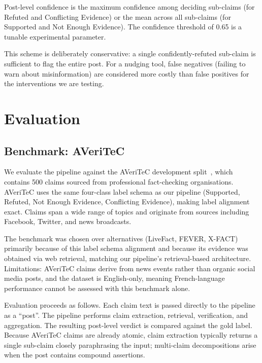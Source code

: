 Post-level confidence is the maximum confidence among deciding sub-claims (for Refuted and Conflicting Evidence) or the mean across all sub-claims (for Supported and Not Enough Evidence). The confidence threshold of 0.65 is a tunable experimental parameter.

This scheme is deliberately conservative: a single confidently-refuted sub-claim is sufficient to flag the entire post. For a nudging tool, false negatives (failing to warn about misinformation) are considered more costly than false positives for the interventions we are testing.

\section{Evaluation}

\subsection{Benchmark: AVeriTeC}

We evaluate the pipeline against the AVeriTeC development split~\cite{schlichtkrull2023averitec}, which contains 500 claims sourced from professional fact-checking organisations. AVeriTeC uses the same four-class label schema as our pipeline (Supported, Refuted, Not Enough Evidence, Conflicting Evidence), making label alignment exact. Claims span a wide range of topics and originate from sources including Facebook, Twitter, and news broadcasts.

The benchmark was chosen over alternatives (LiveFact, FEVER, X-FACT) primarily because of this label schema alignment and because its evidence was obtained via web retrieval, matching our pipeline's retrieval-based architecture. Limitations: AVeriTeC claims derive from news events rather than organic social media posts, and the dataset is English-only, meaning French-language performance cannot be assessed with this benchmark alone.

Evaluation proceeds as follows. Each claim text is passed directly to the pipeline as a ``post''. The pipeline performs claim extraction, retrieval, verification, and aggregation. The resulting post-level verdict is compared against the gold label. Because AVeriTeC claims are already atomic, claim extraction typically returns a single sub-claim closely paraphrasing the input; multi-claim decompositions arise when the post contains compound assertions.

